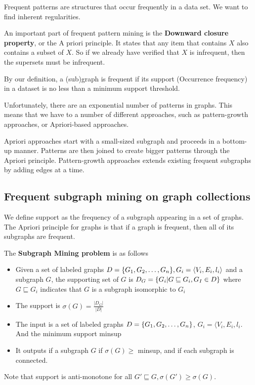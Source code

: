 Frequent patterns are structures that occur frequently in a data set. We want to find inherent regularities. 

An important part of frequent pattern mining is the \textbf{Downward closure property}, or the A priori principle. It states that any item that contains $X$ also contains a subset of $X$. So if we already have verified that $X$ is infrequent, then the supersets must be infrequent.

By our definition, a (sub)graph is frequent if its support (Occurrence frequency) in a dataset is no less than a minimum support threshold. 

Unfortunately, there are an exponential number of patterns in graphs. This means that we have to a number of different approaches, such as pattern-growth approaches, or Apriori-based approaches. 

Apriori approaches start with a small-sized subgraph and proceeds in a bottom-up manner. Patterns are then joined to create bigger patterns through the Apriori principle. Pattern-growth approaches extends existing frequent subgraphs by adding edges at a time.

\subsection{Frequent subgraph mining on graph collections}
    We define support as the frequency of a subgraph appearing in a set of graphs. The Apriori principle for graphs is that if a graph is frequent, then all of its subgraphs are frequent. 
    
    The \textbf{Subgraph Mining problem} is as follows 
    \begin{itemize}
        \item Given a set of labeled graphs $D = \{G_1, G_2, \dots, G_n\}, G_i = \langle V_i, E_i, l_i \rangle$ and a subgraph $G$, the supporting set of $G$ is $D_G = \{G_i | G \sqsubseteq G_i, G_I \in D\}$ where $G \sqsubseteq G_i$ indicates that $G$ is a subgraph isomorphic to $G_i$
        \item The support is $\sigma(G) = \frac{|D_G|}{|D|}$
        \item The input is a set of labeled graphs $D = \{G_1, G_2, \dots, G_n\}$, $G_i = \langle V_i, E_i, l_i$. And the minimum support minsup
        \item It outputs if a subgraph $G$ if $\sigma(G) \geq $ minsup, and if each subgraph is connected. 
    \end{itemize}
    Note that support is anti-monotone for all $G' \sqsubseteq G, \sigma(G') \geq \sigma(G)$. 
    
